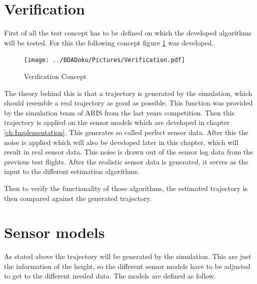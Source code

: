 % 
%   
 
  
  \section{Verification}
  First of all the test concept has to be defined on which the developed algorithms will be tested.
  For this the following concept figure \ref{fig:Verification} was developed.
  
  \begin{figure}[h!]
   \centering
   \texttt{[image: ../BDADoku/Pictures/Verification.pdf]}
   \caption{Verification Concept}
   \label{fig:Verification}
  \end{figure}

  The theory behind this is that a trajectory is generated by the simulation, which should resemble a real trajectory as good as possible.
  This function was provided by the simulation team of ARIS from the last years competition.
  Then this trajectory is applied on the sensor models which are developed in chapter \ref{ch:Implementation}.
  This generates so called perfect sensor data. 
  After this the noise is applied which will also be developed later in this chapter, which will result in real sensor data. 
  This noise is drawn out of the sensor log data from the previous test flights.
  After the realistic sensor data is generated, it serves as the input to the different estimation algorithms.
  
  Then to verify the functionality of those algorithms, the estimated trajectory is then compared against the generated trajectory.
  
  
  
  \section{Sensor models}
  As stated above the trajectory will be generated by the simulation. 
  This are just the information of the height, so the different sensor models have to be adjusted to get to the different needed data.
  The models are defined as follow.
  
